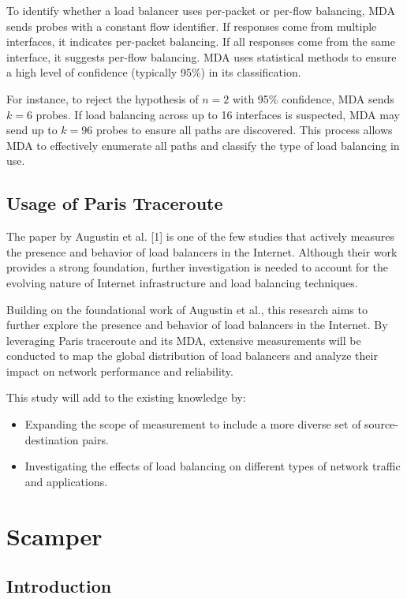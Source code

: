 \documentclass[12pt]{cwru_thesis}
\begin{document}
To identify whether a load balancer uses per-packet or per-flow balancing, MDA sends probes with a constant flow identifier. If responses come from multiple interfaces, it indicates per-packet balancing. If all responses come from the same interface, it suggests per-flow balancing. MDA uses statistical methods to ensure a high level of confidence (typically 95\%) in its classification.

For instance, to reject the hypothesis of \(n = 2\) with 95\% confidence, MDA sends \(k = 6\) probes. If load balancing across up to 16 interfaces is suspected, MDA may send up to \(k = 96\) probes to ensure all paths are discovered. This process allows MDA to effectively enumerate all paths and classify the type of load balancing in use.

\subsection{Usage of Paris Traceroute}

The paper by Augustin et al. [1] is one of the few studies that actively measures the presence and behavior of load balancers in the Internet. Although their work provides a strong foundation, further investigation is needed to account for the evolving nature of Internet infrastructure and load balancing techniques.

Building on the foundational work of Augustin et al., this research aims to further explore the presence and behavior of load balancers in the Internet. By leveraging Paris traceroute and its MDA, extensive measurements will be conducted to map the global distribution of load balancers and analyze their impact on network performance and reliability.

This study will add to the existing knowledge by:
\begin{itemize}
    \item Expanding the scope of measurement to include a more diverse set of source-destination pairs.
    \item Investigating the effects of load balancing on different types of network traffic and applications.
\end{itemize}

\section{Scamper}

\subsection{Introduction}
\end{document}
